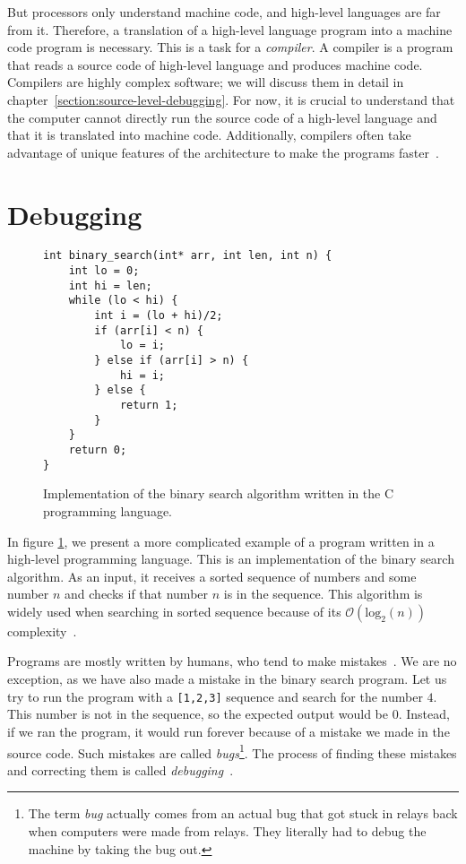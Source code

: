 But processors only understand machine code, and high-level languages are far
from it. Therefore, a translation of a high-level language program into a
machine code program is necessary. This is a task for a \textit{compiler}. A
compiler is a program that reads a source code of high-level language and
produces machine code. Compilers are highly complex software; we will discuss
them in detail in chapter~\ref{section:source-level-debugging}. For now, it is
crucial to understand that the computer cannot directly run the source code of
a high-level language and that it is translated into machine code.
Additionally, compilers often take advantage of unique features of the
architecture to make the programs faster~\cite{dragon-book}.

\section{Debugging}
\begin{figure}
    \begin{verbatim}
int binary_search(int* arr, int len, int n) {
    int lo = 0;
    int hi = len;
    while (lo < hi) {
        int i = (lo + hi)/2;
        if (arr[i] < n) {
            lo = i;
        } else if (arr[i] > n) {
            hi = i;
        } else {
            return 1;
        }
    }
    return 0;
}
    \end{verbatim}
    \caption{Implementation of the binary search algorithm written in the C
    programming language.}
    \label{fig:binary-search}
\end{figure}

In figure \ref{fig:binary-search}, we present a more complicated example of a
program written in a high-level programming language. This is an implementation
of the binary search algorithm. As an input, it receives a sorted sequence of
numbers and some number $n$ and checks if that number $n$ is in the sequence.
This algorithm is widely used when searching in sorted sequence because of its
$\mathcal{O}(\text{log}_2(n))$ complexity~\cite{pruvodce}.

Programs are mostly written by humans, who tend to make
mistakes~\cite{human-error}. We are no exception, as we have also made a
mistake in the binary search program. Let us try to run the program with a
\texttt{[1,2,3]} sequence and search for the number $4$. This number is not in
the sequence, so the expected output would be $0$. Instead, if we ran the
program, it would run forever because of a mistake we made in the source code.
Such mistakes are called \textit{bugs}\footnote{The term \textit{bug} actually
comes from an actual bug that got stuck in relays back when computers were made
from relays. They literally had to debug the machine by taking the bug out.}.
The process of finding these mistakes and correcting them is called
\textit{debugging}~\cite{art-of-testing}.

